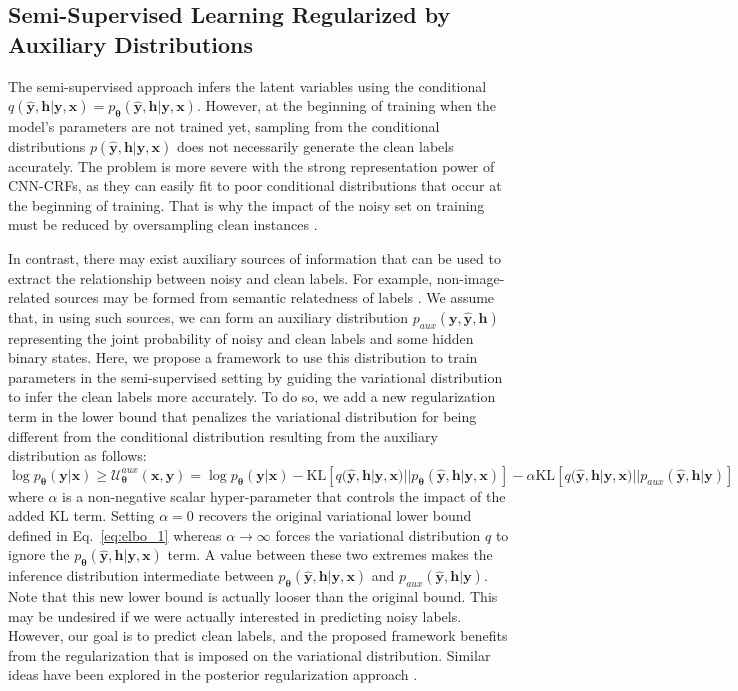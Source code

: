 \documentclass{article}
\newcommand{\x}{{\pmb{x}}}
\newcommand{\y}{{\pmb{y}}}
\newcommand{\yh}{{\hat{\pmb{y}}}}
\newcommand{\h}{{\pmb{h}}}
\newcommand{\btheta}{{\pmb{\theta}}}
\newcommand{\U}{{\mathcal{U}}}
\def\KL{\text{KL}}
\begin{document}
\subsection{Semi-Supervised Learning Regularized by Auxiliary Distributions}
The semi-supervised approach infers the latent variables using the conditional $q(\yh, \h| \y, \x)=p_\btheta(\yh, \h| \y, \x)$. 
However, at the beginning of training when the model's parameters are not trained yet, 
sampling from the conditional distributions $p(\yh, \h| \y, \x)$ does not necessarily generate the clean labels accurately. 
The problem is more severe with the strong representation power of CNN-CRFs, as they can easily fit to poor conditional distributions that occur at the beginning of training. That is why
the impact of the noisy set on training must be reduced by oversampling clean instances \cite{veit2017learning, Xiao2015}. 

In contrast, there may exist auxiliary sources of information that can be used to extract the relationship between noisy and clean labels. 
For example, non-image-related sources may be formed from semantic relatedness of labels \cite{rohrbach2010helps}. 
We assume that, in using such sources, we can form an auxiliary distribution $p_{aux}(\y, \yh, \h)$
representing the joint probability of noisy and clean labels and some hidden binary states.
Here, we propose a framework to use this distribution to train parameters in the semi-supervised setting
by guiding the variational distribution to infer the clean labels more accurately. To do so, 
we add a new regularization term in the lower bound that penalizes the variational distribution for being different from
the conditional distribution resulting from the auxiliary distribution as follows:
{\small
\begin{equation*} %
\log p_\btheta(\y|\x) \geq  \U^{aux}_{\btheta}(\x, \y) = \log p_\btheta(\y|\x) - \KL[q(\yh, \h| \y, \x) || p_\btheta(\yh, \h| \y, \x)] - \alpha \KL[q(\yh, \h| \y, \x) || p_{aux}(\yh, \h| \y)]
\end{equation*}}
where $\alpha$ is a non-negative scalar hyper-parameter that controls the impact of the added KL term.
Setting $\alpha = 0$ recovers the original variational lower bound
defined in Eq.~\ref{eq:elbo_1} whereas $\alpha \rightarrow \infty$  forces the variational distribution $q$ to ignore the $p_\btheta(\yh, \h| \y, \x)$ term. 
A value between these two extremes makes the inference distribution intermediate between $p_\btheta(\yh, \h| \y, \x)$
and $p_{aux}(\yh, \h| \y)$. Note that this new lower bound is actually looser than the original bound. This may be undesired if
we were actually interested in predicting noisy labels. However, our goal is to predict clean labels, and the proposed framework benefits
from the regularization that is imposed on the variational distribution. Similar ideas have been explored in the posterior regularization approach \cite{ganchev2010posterior}.
\end{document}
